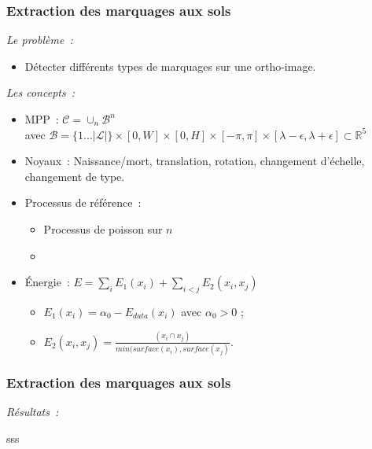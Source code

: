 \documentclass{beamer}
\begin{document}
\begin{frame}
\frametitle{Extraction des marquages aux sols}
\emph{Le probl\`eme~:} 
\begin{itemize}
\item Détecter différents types de marquages sur une ortho-image.
\end{itemize}
\emph{Les concepts~:}
\begin{itemize}
\item MPP~:  $\mathcal{C} = \cup_{n}\mathcal{B}^n$\\
avec $\mathcal{B}=\{1...\vert \mathcal{L}\vert\}\times [0,W]\times[0,H]\times[-\pi,\pi]\times[\lambda-\epsilon,\lambda + \epsilon] \subset  \mathds{R}^{5}$
\item Noyaux~: Naissance/mort, translation, rotation, changement d'échelle, changement de type. 
\item Processus de référence~:
\begin{itemize}
\item Processus de poisson sur $n$
\item \color{red}{Data\&Model driven}
\end{itemize}
\item \'Energie~: $E = \sum_i E_1(x_i) + \sum_{i<j} E_2(x_i,x_j)$
\begin{itemize}
\item $E_1(x_i)=\alpha_{0} - E_{data}(x_i)$ avec $\alpha_{0}>0$ ;
\item $E_2(x_i,x_j) = \frac{(x_i \cap x_j)}{min(surface(x_i),surface(x_j)}$.
\end{itemize}
\end{itemize}
\end{frame}
%
\begin{frame}
\frametitle{Extraction des marquages aux sols}
\emph{R\'esultats~:}
\begin{center}
\begin{figure}[ht]
\end{figure}
sss
\end{center}
\end{frame}
\end{document}
